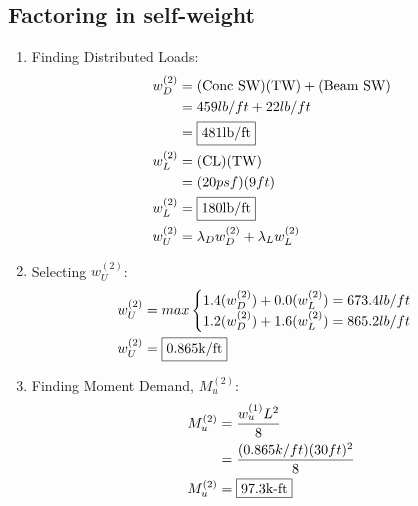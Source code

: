 \documentclass{report} %
\begin{document}
\subsection*{Factoring in self-weight}
\begin{enumerate}
    \item Finding Distributed Loads:
        \begin{equation*}
            \begin{aligned}
                w^{(2)}_D   &= (\text{Conc SW}) (\text{TW}) + (\text{Beam SW}) \\
                            &= 459lb/ft + 22lb/ft \\
                            &= \framebox{481lb/ft} \\
                w^{(2)}_L &= (\text{CL}) (\text{TW}) \\
                            &= (20psf)(9ft) \\
                w^{(2)}_L &= \framebox{180lb/ft} \\
                w^{(2)}_U   &= \lambda _D w^{(2)}_D + \lambda _L w^{(2)}_L \\
            \end{aligned}
        \end{equation*}
    \item Selecting $w^{(2)}_U$:
    \begin{equation*}
        \begin{aligned}
            w^{(2)}_U &= max
                \begin{cases}
                    1.4(w^{(2)}_D) + 0.0(w^{(2)}_L) = 673.4lb/ft \\
                    1.2(w^{(2)}_D) + 1.6(w^{(2)}_L) = 865.2lb/ft \\
                \end{cases} \\
            w^{(2)}_U &= \framebox{0.865k/ft}
        \end{aligned}
    \end{equation*}
    \item Finding Moment Demand, $M^{(2)}_u$:
        \begin{equation*}
            \begin{aligned}
                M^{(2)}_u   &= \frac{{w^{(1)}_u}L^2}{8} \\
                            &= \frac{(0.865k/ft)(30ft)^2}{8} \\
                M^{(2)}_u   &= \framebox{97.3k-ft}
            \end{aligned}

\end{equation*}
\end{enumerate}
\end{document}
